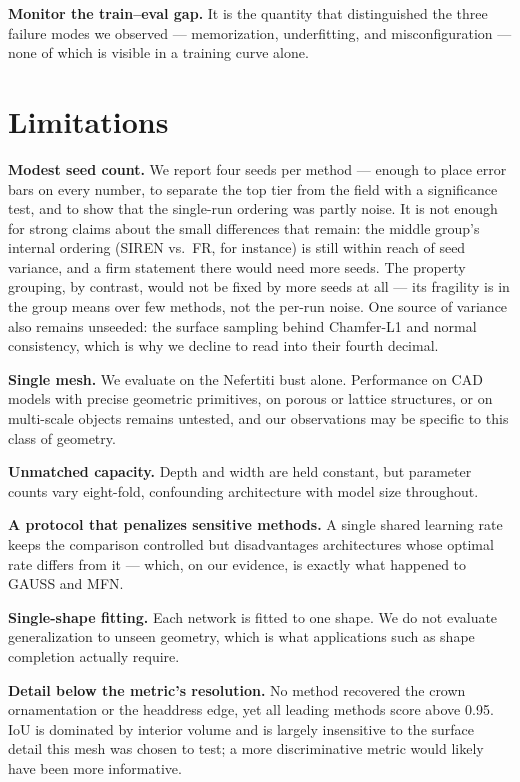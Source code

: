 \textbf{Monitor the train--eval gap.} It is the quantity that distinguished the three failure modes we observed --- memorization, underfitting, and misconfiguration --- none of which is visible in a training curve alone.

\section{Limitations}

\textbf{Modest seed count.} We report four seeds per method --- enough to place error bars on every number, to separate the top tier from the field with a significance test, and to show that the single-run ordering was partly noise. It is not enough for strong claims about the small differences that remain: the middle group's internal ordering (SIREN vs.\ FR, for instance) is still within reach of seed variance, and a firm statement there would need more seeds. The property grouping, by contrast, would not be fixed by more seeds at all --- its fragility is in the group means over few methods, not the per-run noise. One source of variance also remains unseeded: the surface sampling behind Chamfer-L1 and normal consistency, which is why we decline to read into their fourth decimal.

\textbf{Single mesh.} We evaluate on the Nefertiti bust alone. Performance on CAD models with precise geometric primitives, on porous or lattice structures, or on multi-scale objects remains untested, and our observations may be specific to this class of geometry.

\textbf{Unmatched capacity.} Depth and width are held constant, but parameter counts vary eight-fold, confounding architecture with model size throughout.

\textbf{A protocol that penalizes sensitive methods.} A single shared learning rate keeps the comparison controlled but disadvantages architectures whose optimal rate differs from it --- which, on our evidence, is exactly what happened to GAUSS and MFN.

\textbf{Single-shape fitting.} Each network is fitted to one shape. We do not evaluate generalization to unseen geometry, which is what applications such as shape completion actually require.

\textbf{Detail below the metric's resolution.} No method recovered the crown ornamentation or the headdress edge, yet all leading methods score above 0.95. IoU is dominated by interior volume and is largely insensitive to the surface detail this mesh was chosen to test; a more discriminative metric would likely have been more informative.

